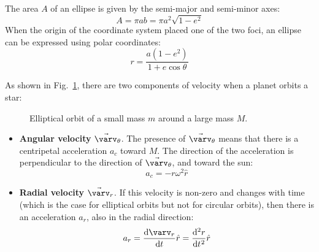 \documentclass{../../oss-handout}
\begin{document}
The area $A$ of an ellipse is given by the semi-major and semi-minor axes:
\begin{equation}
  A=\pi ab=\pi a^2\sqrt{1-e^2}
  \label{A2}
\end{equation}
When the origin of the coordinate system placed one of the two foci, an ellipse
can be expressed using polar coordinates:
\begin{equation}
  r=\frac{a(1-e^2)}{1+e\cos\theta}
  \label{ellipse-eq}
\end{equation}

As shown in Fig.~\ref{eorbit}, there are two components of velocity when a
planet orbits a star:
\begin{figure}[!ht]
  \centering
  \caption{Elliptical orbit of a small mass $m$ around a large mass $M$.}
  \label{eorbit}
\end{figure}
\begin{itemize}
\item\textbf{Angular velocity} $\vec\varv_\theta$. The presence of
  $\vec\varv_\theta$ means that there is a centripetal acceleration $a_c$ toward
  $M$. The direction of the acceleration is perpendicular to the direction of
  $\vec\varv_\theta$, and toward the sun:
  \begin{equation}
    a_c=-r\omega^2\hat r
  \end{equation}
\item\textbf{Radial velocity} $\vec\varv_r$. If this velocity is non-zero and
  changes with time (which is the case for elliptical orbits but not for
  circular orbits), then there is an acceleration $a_r$, also in the radial
  direction:
  \begin{equation}
    a_r=\diff{\varv_r}t\hat r=\diff[2]rt\hat r
  \end{equation}
\end{itemize}
\end{document}
